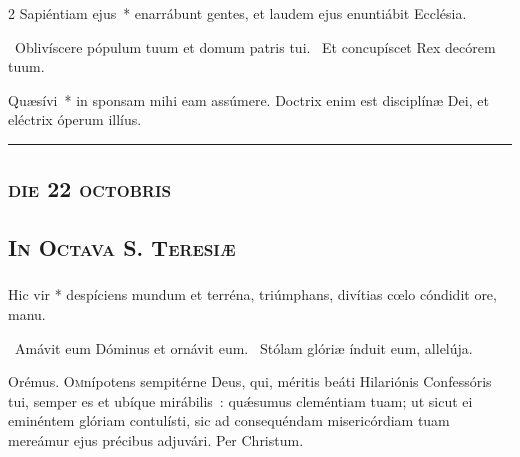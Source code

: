\documentclass[9pt,twoside]{extarticle}
\begin{document}
\begin{multicols}{2}
 Sapiéntiam ejus~* enarrábunt gentes, et laudem ejus enuntiábit Ecclésia.

~Oblivíscere pópulum tuum et domum patris tui. ~Et concupíscet Rex decórem tuum.

\smallskip
{} Quæsívi~* in sponsam mihi eam assúmere. Doctrix enim est disciplínæ Dei, et eléctrix óperum illíus.

\begin{center}\textcolor{red}{\rule{\linewidth}{0.5pt}} \end{center}
\subsection*{\center \normalfont \textsc{die 22 octobris}}
\subsection*{\center \textsc{In Octava S. Teresiæ}}
\subsubsection*{\center {}}

\smallskip
\small {}


\normalsize
{} Hic vir * despíciens mundum et terréna, triúmphans, divítias cœlo cóndidit ore, manu.

~Amávit eum Dóminus et ornávit eum. ~Stólam glóriæ índuit eum, allelúja.

\smallskip
Orémus. \hfill {}
\lettrine{O}mnípotens sempitérne Deus, qui, méritis beáti Hilariónis Confessóris tui, semper es et ubíque mirábilis~: quǽsumus cleméntiam tuam; ut sicut ei eminéntem glóriam contulísti, sic ad consequéndam misericórdiam tuam mereámur ejus précibus adjuvári. Per Christum.


\end{multicols}
\end{document}
